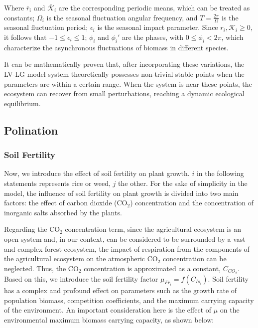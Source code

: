 \documentclass{HZNUMCM}
\begin{document}
        Where $\bar{r}_i$ and $\bar{\mathscr{K}}_i$ are the corresponding periodic means, 
        which can be treated as constants; $\Omega_i$ is the seasonal fluctuation angular frequency, 
        and $T = \frac{2\pi}{\Omega}$ is the seasonal fluctuation period; 
        $\epsilon_i$ is the seasonal impact parameter. Since $r_i, \mathscr{K}_i \geqslant 0$, 
        it follows that $-1 \leqslant \epsilon_i \leqslant 1$; $\phi_i$ and $\phi_i'$ are the phases, 
        with $0 \leqslant \phi_i < 2\pi$, which characterize the asynchronous fluctuations of biomass in different species.

        It can be mathematically proven that, after incorporating these variations, 
        the LV-LG model system theoretically possesses non-trivial stable points when the parameters are within a certain range. 
        When the system is near these points, the ecosystem can recover from small perturbations, 
        reaching a dynamic ecological equilibrium.
      \subsection{Polination}
      \subsubsection{Soil Fertility}
        Now, we introduce the effect of soil fertility on plant growth.
        $i$ in the following statements represents rice or weed, $j$ the other.
        For the sake of simplicity in the model, 
        the influence of soil fertility on plant growth is divided into two main factors: 
        the effect of carbon dioxide (CO$_2$) concentration and the concentration of inorganic salts absorbed by the plants.

        Regarding the CO$_2$ concentration term, 
        since the agricultural ecosystem is an open system and, 
        in our context, can be considered to be surrounded by a vast and complex forest ecosystem, 
        the impact of respiration from the components of the agricultural ecosystem on the atmospheric CO$_2$ concentration can be neglected. 
        Thus, the CO$_2$ concentration is approximated as a constant, \( C_{CO_2} \). 
        Based on this, we introduce the soil fertility factor \( \mu_{Fr_i} = f(C_{Is_i}) \). 
        Soil fertility has a complex and profound effect on parameters such as the growth rate of population biomass, 
        competition coefficients, and the maximum carrying capacity of the environment. 
        An important consideration here is the effect of \( \mu \) on the environmental maximum biomass carrying capacity, 
        as shown below:
\end{document}
